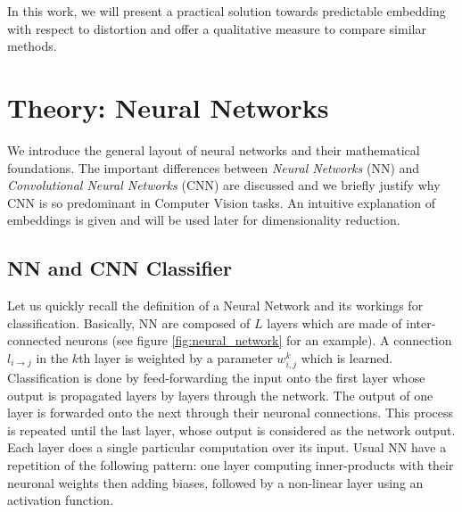 \documentclass[a4paper,12pt]{report}
\begin{document}
In this work, we will present a practical solution towards predictable embedding with respect to distortion and offer a qualitative measure to compare similar methods. %


\chapter{Theory: Neural Networks}
We introduce the general layout of neural networks and their mathematical foundations.
The important differences between {\em Neural Networks} (NN) and {\em Convolutional Neural Networks} (CNN) are discussed and we briefly justify why CNN is so predominant in Computer Vision tasks.
An intuitive explanation of embeddings is given and will be used later for dimensionality reduction.

\section{NN and CNN Classifier}

Let us quickly recall the definition of a Neural Network and its workings for classification.
Basically, NN are composed of $L$ layers which are made of inter-connected neurons (see figure \ref{fig:neural_network} for an example).
A connection $l_{i \rightarrow j}$ in the $k$th layer is weighted by a parameter $w^k_{i,j}$ which is learned.
Classification is done by feed-forwarding the input onto the first layer whose output is propagated layers by layers through the network.
The output of one layer is forwarded onto the next through their neuronal connections.
This process is repeated until the last layer, whose output is considered as the network output.
Each layer does a single particular computation over its input.
Usual NN have a repetition of the following pattern: one layer computing inner-products with their neuronal weights then adding biases, followed by a non-linear layer using an activation function.
\end{document}

